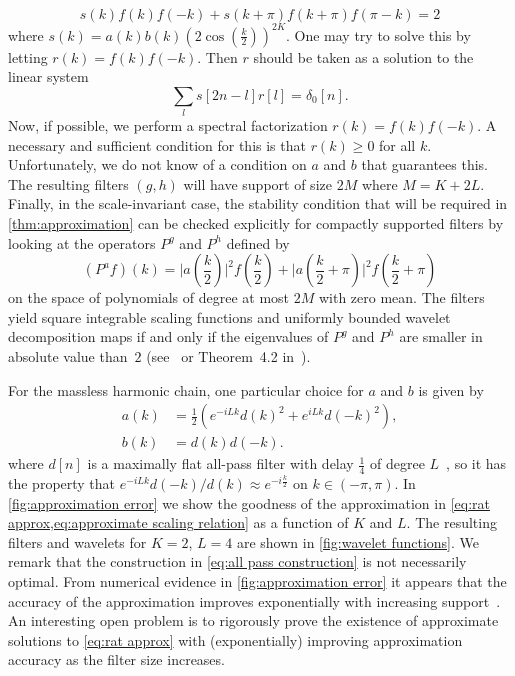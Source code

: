\documentclass[submission, Phys]{SciPost}
\theoremstyle{definition}
\theoremstyle{remark}
\newcommand{\change}[1]{#1}
\begin{document}
\begin{appendix}
\begin{equation*}
  s(k)f(k)f(-k) + s(k+\pi)f(k + \pi)f(\pi -k) = 2
\end{equation*}
where $s(k) = a(k)b(k)(2\cos(\frac{k}{2}))^{2K}$.
One may try to solve this by letting $r(k) = f(k)f(-k)$. Then $r$ should be taken as a solution to the linear system
\begin{equation*}
  \sum_l s[2n - l]r[l] = \delta_0[n].
\end{equation*}
Now, if possible, we perform a spectral factorization $r(k) = f(k)f(-k)$.
A necessary and sufficient condition for this is that $r(k) \geq 0$ for all $k$.
Unfortunately, we do not know of a condition on $a$ and $b$ that guarantees this.
The resulting filters $(g,h)$ will have support of size $2M$ where $M = K + 2L$.
Finally, in the scale-invariant case, the stability condition that will be required in \cref{thm:approximation} can be checked explicitly for compactly supported filters by looking at the operators $P^g$ and $P^h$ defined by
\begin{equation*}
  (P^a f)(k) = \lvert a(\frac{k}{2}) \rvert^2 f(\frac{k}{2}) + \lvert a(\frac{k}{2} + \pi) \rvert^2 f(\frac{k}{2} + \pi)
\end{equation*}
on the space of polynomials of degree at most $2M$ with zero mean.
The filters yield square integrable scaling functions and uniformly bounded wavelet decomposition maps if and only if the eigenvalues of $P^g$ and $P^h$ are smaller in absolute value than~$2$ (see~\cite{cohen1992stability} or Theorem~4.2 in~\cite{cohen1995wavelets}).

For the massless harmonic chain, one particular choice for $a$ and $b$ is given by
\begin{equation}\begin{aligned}\label{eq:all pass construction}
  a(k) &= \frac12 (e^{-iLk}d(k)^2 + e^{iLk}d(-k)^2),\\
  b(k) &= d(k)d(-k).
\end{aligned}\end{equation}
where $d[n]$ is a maximally flat all-pass filter with delay $\frac14$ of degree $L$~\cite{selesnick2002design}, so it has the property that $e^{-iLk}d(-k)/d(k) \approx e^{-i\frac{k}{2}}$ on $k \in (-\pi,\pi)$.
In \cref{fig:approximation error} we show the goodness of the approximation in \cref{eq:rat approx,eq:approximate scaling relation} as a function of $K$ and $L$.
The resulting filters and wavelets for $K=2$, $L=4$ are shown in \cref{fig:wavelet functions}.
We remark that the construction in \cref{eq:all pass construction} is not necessarily optimal.
\change{From numerical evidence in \cref{fig:approximation error} it appears that the accuracy of the approximation improves exponentially with increasing support~\cite{pyfermions}.
An interesting open problem is to rigorously prove the existence of approximate solutions to \cref{eq:rat approx} with (exponentially) improving approximation accuracy as the filter size increases.}


\end{appendix}
\end{document}
